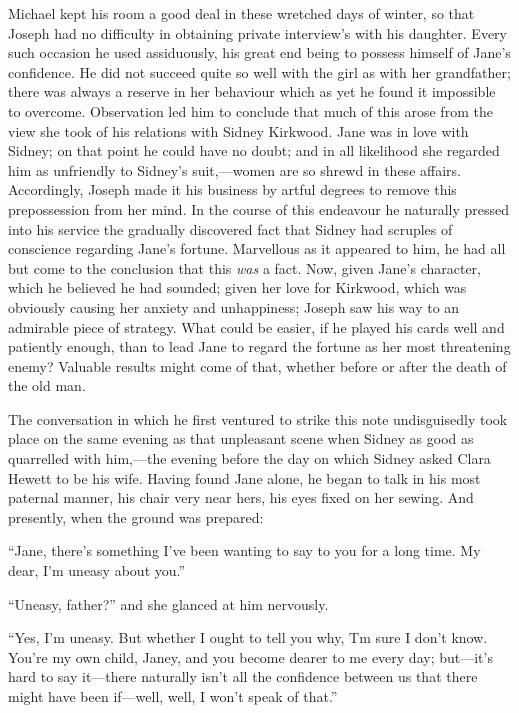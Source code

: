 Michael kept his room a good deal in these wretched days of winter, so
that Joseph had no difficulty in obtaining private interview's with his
daughter. Every such occasion he {\protect\hypertarget{122}{}{}}used
assiduously, his great end being to possess himself of Jane's
confidence. He did not succeed quite so well with the girl as with her
grandfather; there was always a reserve in her behaviour which as yet he
found it impossible to overcome. Observation led him to conclude that
much of this arose from the view she took of his relations with Sidney
Kirkwood. Jane was in love with Sidney; on that point he could have no
doubt; and in all likelihood she regarded him as unfriendly to Sidney's
suit,---women are so shrewd in these affairs. Accordingly, Joseph made
it his business by artful degrees to remove this prepossession from her
mind. In the course of this endeavour he naturally pressed into his
service the gradually discovered fact that Sidney had scruples of
conscience regarding Jane's fortune. Marvellous as it appeared to him,
he had all but come to the conclusion that this \emph{was} a fact. Now,
given Jane's character, which he believed he had sounded; given her love
for Kirkwood, which was obviously causing her anxiety and unhappiness;
Joseph saw his way to an admirable piece of strategy. What could be
easier, if he played his cards well and patiently enough,
{\protect\hypertarget{123}{}{}}than to lead Jane to regard the fortune
as her most threatening enemy? Valuable results might come of that,
whether before or after the death of the old man.

The conversation in which he first ventured to strike this note
undisguisedly took place on the same evening as that unpleasant scene
when Sidney as good as quarrelled with him,---the evening before the day
on which Sidney asked Clara Hewett to be his wife. Having found Jane
alone, he began to talk in his most paternal manner, his chair very near
hers, his eyes fixed on her sewing. And presently, when the ground was
prepared:

``Jane, there's something I've been wanting to say to you for a long
time. My dear, I'm uneasy about you.''

``Uneasy, father?'' and she glanced at him nervously.

``Yes, I'm uneasy. But whether I ought to tell you why, Tm sure I don't
know. You're my own child, Janey, and you become dearer to me every day;
but---it's hard to say it---there naturally isn't all the confidence
between us that there might have been if---well, well, I won't speak of
that.''

